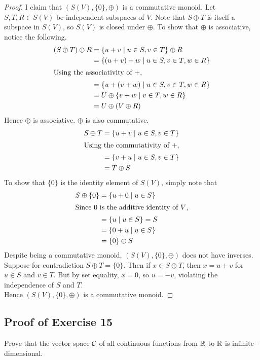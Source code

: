 \begin{proof}
I claim that $(S(V),\{0\},\oplus)$ is a commutative monoid. Let $S,T,R\in S(V)$ be independent subspaces of $V$. Note that $S\oplus T$ is itself a subspace in $S(V)$, so $S(V)$ is closed under $\oplus$. To show that $\oplus$ is associative, notice the following.
\begin{align*}
	(S\oplus T)\oplus R & = \{u+v\mid u\in S,v\in T\}\oplus R\\
	& = \{(u+v)+w\mid u\in S,v\in T,w\in R\}\\
		\intertext{Using the associativity of $+$,}
	& = \{u+(v+w)\mid u\in S,v\in T, w\in R\}\\
	& = U\oplus \{v+w\mid v\in T, w\in R\}\\
	& = U\oplus (V\oplus R)
\end{align*} 
Hence $\oplus$ is associative. $\oplus$ is also commutative.
\begin{align*}
	S\oplus T & = \{u+v\mid u\in S, v\in T\}\\
	\intertext{Using the commutativity of $+$,}
	& = \{v+u\mid u\in S, v\in T\}\\
	& = T\oplus S
\end{align*}
To show that $\{0\}$ is the identity element of $S(V)$, simply note that
\begin{align*}
	S\oplus \{0\} & = \{u+0\mid u\in S\}\\
	\intertext{Since 0 is the additive identity of $V$,}
	& = \{u\mid u\in S\} = S\\
	& = \{0+u\mid u\in S\}\\
	& = \{0\}\oplus S
\end{align*}
Despite being a commutative monoid, $(S(V),\{0\},\oplus)$ does not have inverses. Suppose for contradiction $S\oplus T=\{0\}$. Then if $x\in S\oplus T$, then $x = u + v$ for $u\in S$ and $v\in T$. But by set equality, $x = 0$, so $u=-v$, violating the independence of $S$ and $T$.\\

Hence $(S(V),\{0\},\oplus)$ is a commutative monoid.
\end{proof}

\vfill
\pagebreak

\subsection{Proof of Exercise 15}
Prove that the vector space ${\mathcal{C}}$ of all continuous functions from ${\mathbb{R}}$ to ${\mathbb{R}}$ is infinite-dimensional.

